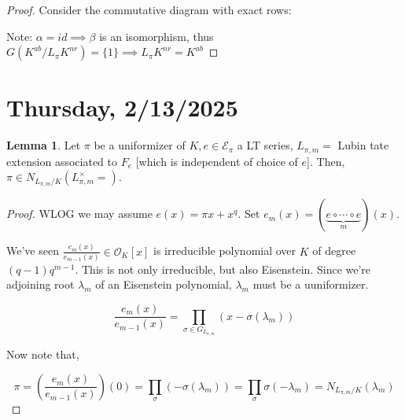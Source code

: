 \documentclass{article}
\theoremstyle{definition}
\numberwithin{theorem}{subsection}
\newtheorem{lemma}[theorem]{Lemma}
\begin{document}
    \begin{proof}
        Consider the commutative diagram with exact rows:

        \begin{center}
        \end{center}

        Note: \(\alpha = id \implies \beta\) is an isomorphism, thus \(G(K^{ab} / L_\pi K^{nr}) = \{ 1 \} \implies L_\pi K^{nr} = K^{ab}\) 
    \end{proof}
    
    \section*{Thursday, 2/13/2025}
    
    \begin{lemma}
        Let \(\pi\) be a uniformizer of \(K, e \in \mathscr{E}_\pi\) a LT series, \(L_{\pi, m} =\) Lubin tate extension associated to \(F_e\) [which is independent of choice of \(e\)]. Then, \(\pi\in N_{L_{\pi, m} / K}(L_{\pi, m}^\times =)\).
    \end{lemma}

    \begin{proof}
        WLOG we may assume \(e(x) = \pi x + x^q\). Set \(e_m(x) = (\underbrace{e \circ \cdots \circ e}_{m})(x)\).
        
        We've seen \(\frac{e_m(x)}{e_{m-1}(x)} \in \mathcal{O}_K[x]\) is irreducible polynomial over \(K\) of degree \((q-1)q^{m-1}\). This is not only irreducible, but also Eisenstein. Since we're adjoining root \(\lambda_m\) of an Eisenstein polynomial, \(\lambda_m\) must be a uuniformizer.
        
        \[
            \frac{e_m(x)}{e_{m-1}(x)} = \prod_{\sigma\in G_{L_{\pi,m}}} (x-\sigma(\lambda_m))
        \]

        Now note that,

        \[
            \pi = \left( \frac{e_m(x)}{e_{m-1}(x)} \right) (0) = \prod_\sigma (-\sigma(\lambda_m)) = \prod_\sigma \sigma(-\lambda_m) = N_{L_{\pi,m} / K} (\lambda_m)
        \]

    \end{proof}
\end{document}
